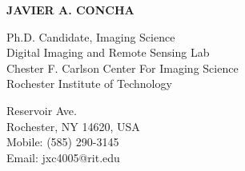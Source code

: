 \documentclass[11pt]{res} %
\begin{document}
 
{\centering \Large \bf JAVIER A. CONCHA\par} %
\vspace{0.3in}                                         
\begin{multicols}{2}
{\raggedright Ph.D. Candidate, Imaging Science \\ Digital Imaging and Remote Sensing Lab\\Chester F. Carlson Center For Imaging Science \\ Rochester Institute of Technology\\}
{ Reservoir Ave.\\Rochester, NY 14620, USA\\Mobile: (585) 290-3145\\Email: jxc4005@rit.edu\\}
\end{multicols}
\vspace{-0.3in} 
\hrulefill
\end{document}
